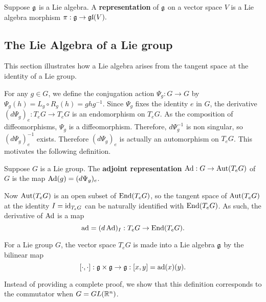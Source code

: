 \documentclass[a4paper]{article}
\begin{document}
\begin{defi}
    Suppose $\mathfrak{g}$ is a Lie algebra. A \textbf{representation} of $\mathfrak{g}$ on a vector space $V$ is a Lie algebra morphism 
    $\pi : \mathfrak{g} \to \mathfrak{gl}(V).$
\end{defi}

\subsection{The Lie Algebra of a Lie group}
This section illustrates how a Lie algebra arises from the tangent space at the identity of a Lie group.

For any $g \in G$, we define the conjugation action $\Psi_g: G \to G$ by $\Psi_g(h) = L_g \circ R_g (h) = ghg^{-1}$.  Since $\Psi_g$ fixes the identity $e$ in $G$, the derivative $(d\Psi_g)_e : T_e G \to T_e G$ is an endomorphism on $T_e G$. As the composition of diffeomorphisms, $\Psi_g$ is a diffeomorphism. Therefore, $d\Psi_g^{-1}$ is non singular, so $(d\Psi_g)^{-1}_e$ exists. Therefore $(d\Psi_g)_e$ is actually an automorphism on $T_e G$. This motivates the following definition.

\begin{defi}
    Suppose $G$ is a Lie group. The \textbf{adjoint representation} $\operatorname{Ad}: G \to \operatorname{Aut}(T_e G)$ of $G$ is the map $\operatorname{Ad}(g) = (d\Psi_g)_e$.
\end{defi}

Now $\operatorname{Aut}(T_e G)$ is an open subset of $\operatorname{End}(T_e G)$, so the tangent space of $\operatorname{Aut}(T_e G)$ at the identity $I = \operatorname{id}_{T_e G}$ can be naturally identified with $\operatorname{End}(T_e G)$. As such, the derivative of $\operatorname{Ad}$ is a map
$$\operatorname{ad} = (d\operatorname{Ad})_{I}: T_e G \to \operatorname{End}(T_e G).$$

\begin{thm}
    For a Lie group $G$, the vector space $T_e G$ is made into a Lie algebra $\mathfrak{g}$ by the bilinear map
    $$\left[ \cdot, \cdot \right] : \mathfrak{g} \times \mathfrak{g} \to \mathfrak{g} : \left[ x, y \right] = \operatorname{ad}(x)(y).$$
\end{thm}

Instead of providing a complete proof, we show that this definition corresponds to the commutator when $G = GL(\mathbb{R}^n)$.
\end{document}
